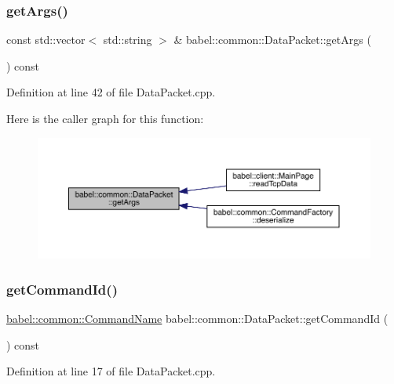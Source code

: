 \subsubsection{\texorpdfstring{get\+Args()}{getArgs()}}
{\footnotesize\ttfamily const std\+::vector$<$ std\+::string $>$ \& babel\+::common\+::\+Data\+Packet\+::get\+Args (\begin{DoxyParamCaption}{ }\end{DoxyParamCaption}) const}



Definition at line 42 of file Data\+Packet.\+cpp.

Here is the caller graph for this function\+:\nopagebreak
\begin{figure}[H]
\begin{center}
\leavevmode
\includegraphics[width=350pt]{classbabel_1_1common_1_1_data_packet_a9b5191cfb79290db7eea1a9b9aff3936_icgraph}
\end{center}
\end{figure}
\mbox{\label{classbabel_1_1common_1_1_data_packet_a70997898a38b52a810dcaab6e390e13b}} 
\subsubsection{\texorpdfstring{get\+Command\+Id()}{getCommandId()}}
{\footnotesize\ttfamily \mbox{\hyperlink{namespacebabel_1_1common_a2d31f246c776da6bf656bd71e86cbb2c}{babel\+::common\+::\+Command\+Name}} babel\+::common\+::\+Data\+Packet\+::get\+Command\+Id (\begin{DoxyParamCaption}{ }\end{DoxyParamCaption}) const}



Definition at line 17 of file Data\+Packet.\+cpp.

